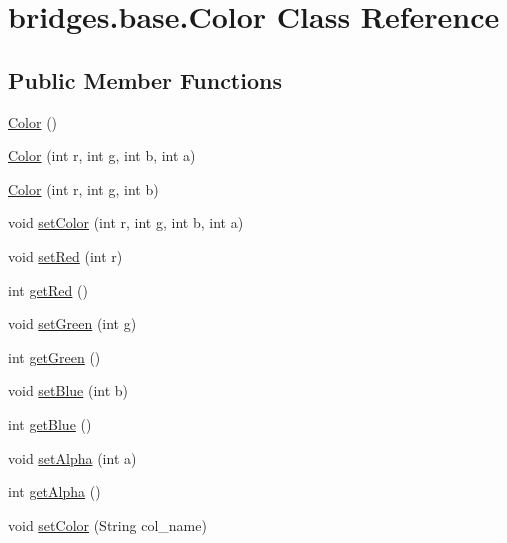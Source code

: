 \hypertarget{classbridges_1_1base_1_1_color}{}\section{bridges.\+base.\+Color Class Reference}
\label{classbridges_1_1base_1_1_color}
\subsection*{Public Member Functions}
\begin{DoxyCompactItemize}
\item 
\hyperlink{classbridges_1_1base_1_1_color_ab6d71ac2ee1430fb2db2fbe34e692de8}{Color} ()
\item 
\hyperlink{classbridges_1_1base_1_1_color_a8a8b586ef5d11853c7abb82ed002f522}{Color} (int r, int g, int b, int a)
\item 
\hyperlink{classbridges_1_1base_1_1_color_a5fab564fa4eec8bece64f847ebd42948}{Color} (int r, int g, int b)
\item 
void \hyperlink{classbridges_1_1base_1_1_color_a2e7e512e04f6e6b6ac52de7315f851e6}{set\+Color} (int r, int g, int b, int a)
\item 
void \hyperlink{classbridges_1_1base_1_1_color_a1d78967703924b709e76def5b2b3ee9a}{set\+Red} (int r)
\item 
int \hyperlink{classbridges_1_1base_1_1_color_af1a30dc925b35d6bfe609f8838651025}{get\+Red} ()
\item 
void \hyperlink{classbridges_1_1base_1_1_color_a415a28133ade4e216c02ecdfc8a32a1d}{set\+Green} (int g)
\item 
int \hyperlink{classbridges_1_1base_1_1_color_a8f3fdd23cf785704faa2e3701e25978f}{get\+Green} ()
\item 
void \hyperlink{classbridges_1_1base_1_1_color_a0e04156b1573cf8002c4d9cb69825657}{set\+Blue} (int b)
\item 
int \hyperlink{classbridges_1_1base_1_1_color_ad4b82e1eb9ff59857d2868edd8d4ce65}{get\+Blue} ()
\item 
void \hyperlink{classbridges_1_1base_1_1_color_a666a54080c5712416314210cec6d511a}{set\+Alpha} (int a)
\item 
int \hyperlink{classbridges_1_1base_1_1_color_ad51f053175eade348a265fbb06aac7ea}{get\+Alpha} ()
\item 
void \hyperlink{classbridges_1_1base_1_1_color_a54dcd31227bde0f5d0a4f5d3b5a24ed2}{set\+Color} (String col\+\_\+name)
\end{DoxyCompactItemize}


